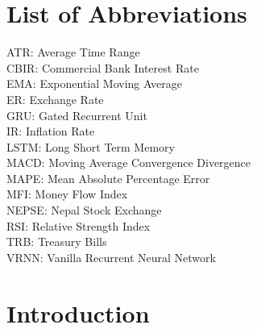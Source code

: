 \chapter*{List of Abbreviations}
ATR:      Average Time Range\\
CBIR:   Commercial Bank Interest Rate\\
EMA:     Exponential Moving Average\\
ER:        Exchange Rate\\
GRU:    Gated Recurrent Unit\\
IR:         Inflation Rate \\
LSTM:  Long Short Term Memory\\
MACD:  Moving Average Convergence Divergence\\
MAPE:   Mean Absolute Percentage Error\\
MFI:       Money Flow Index\\
NEPSE:  Nepal Stock Exchange\\
RSI:        Relative Strength Index\\
TRB:      Treasury Bills\\
VRNN: Vanilla Recurrent Neural Network\\


\newpage
{} %

\chapter{Introduction}
\vspace{-18pt}
